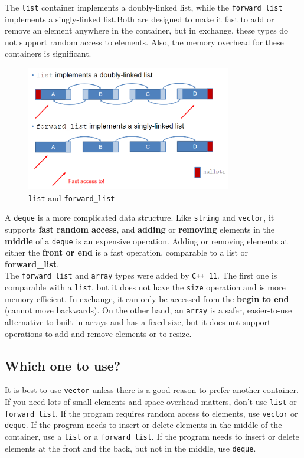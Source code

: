 The \texttt{list} container implements a doubly-linked list, while the \texttt{forward\_list} 
implements a singly-linked list.Both are designed to make it fast to add or remove an element
anywhere in the container, but in exchange, these types do not support random access to
elements. Also, the memory overhead for these containers is significant.

\begin{figure}[H]
    \centering
    \includegraphics[width=0.8\textwidth]{figures/linked_lists.png}
    \caption{\texttt{list} and \texttt{forward\_list}}
    \label{fig:list_forward-list}
\end{figure}

A \texttt{deque} is a more complicated data structure. Like \texttt{string} and \texttt{vector},
it supports \textbf{fast random access}, and \textbf{adding} or \textbf{removing} elements in the
\textbf{middle} of a \texttt{deque} is an expensive operation. Adding or removing elements at
either the \textbf{front or end} is a fast operation, comparable to a list or \textbf{forward\_list}.\\

The \texttt{forward\_list} and \texttt{array} types were added by \texttt{C++ 11}. The first one
is comparable with a \texttt{list}, but it does not have the \texttt{size} operation and is more
memory efficient. In exchange, it can only be accessed from the \textbf{begin to end} (cannot move
backwards). On the other hand, an \texttt{array} is a safer, easier-to-use alternative to built-in
arrays and has a fixed size, but it does not support operations to add and remove elements or to
resize.

\subsection{Which one to use?}

It is best to use \texttt{vector} unless there is a good reason to prefer another container. If 
you need lots of small elements and space overhead matters, don't use \texttt{list} or
\texttt{forward\_list}. If the program requires random access to elements, use \texttt{vector}
or \texttt{deque}. If the program needs to insert or delete elements in the middle of the container,
use a \texttt{list} or a \texttt{forward\_list}. If the program needs to insert or delete elements
at the front and the back, but not in the middle, use \texttt{deque}.\\

